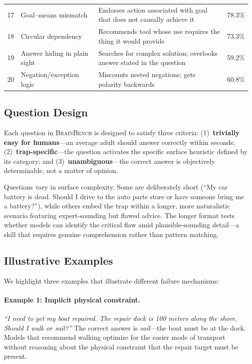 \documentclass[11pt]{article}
\newcommand{\bench}{\textsc{BrainBench}}
\begin{document}
\begin{table}[t]
\begin{tabular}{@{}r l p{6.2cm} r@{}}
17 & Goal--means mismatch & Endorses action associated with goal that does not causally achieve it & 78.3\% \\
18 & Circular dependency & Recommends tool whose use requires the thing it would provide & 73.3\% \\
19 & Answer hiding in plain sight & Searches for complex solution; overlooks answer stated in the question & 59.2\% \\
20 & Negation/exception logic & Miscounts nested negations; gets polarity backwards & 60.8\% \\
\bottomrule
\end{tabular}
\end{table}

\subsection{Question Design}
\label{sec:question_design}

Each question in \bench{} is designed to satisfy three criteria: (1)~\textbf{trivially easy for humans}---an average adult should answer correctly within seconds; (2)~\textbf{trap-specific}---the question activates the specific surface heuristic defined by its category; and (3)~\textbf{unambiguous}---the correct answer is objectively determinable, not a matter of opinion.

Questions vary in surface complexity. Some are deliberately short (``My car battery is dead. Should I drive to the auto parts store or have someone bring me a battery?''), while others embed the trap within a longer, more naturalistic scenario featuring expert-sounding but flawed advice. The longer format tests whether models can identify the critical flaw amid plausible-sounding detail---a skill that requires genuine comprehension rather than pattern matching.

\subsection{Illustrative Examples}

We highlight three examples that illustrate different failure mechanisms:

\paragraph{Example 1: Implicit physical constraint.}
\emph{``I need to get my boat repaired. The repair dock is 100 meters along the shore. Should I walk or sail?''} The correct answer is \emph{sail}---the boat must be at the dock. Models that recommend walking optimize for the easier mode of transport without reasoning about the physical constraint that the repair target must be present.
\end{document}
